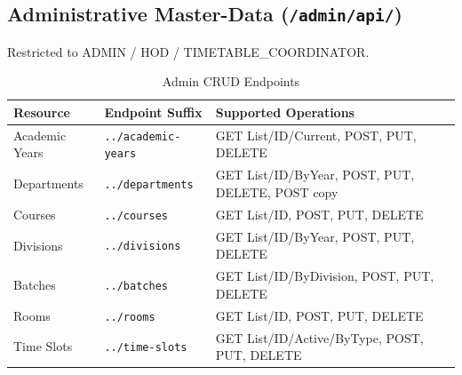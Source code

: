 \subsection{Administrative Master-Data (\texttt{/admin/api/})}
Restricted to ADMIN / HOD / TIMETABLE\_COORDINATOR.
\begin{table}[H]
    \centering
    \renewcommand{\arraystretch}{1.4}
    \begin{tabular}{|p{3.2cm}|p{4.5cm}|p{6.5cm}|}
        \hline
        \textbf{Resource} & \textbf{Endpoint Suffix} & \textbf{Supported Operations} \\
        \hline
        Academic Years & \texttt{../academic-years} & GET List/ID/Current, POST, PUT, DELETE \\
        \hline
        Departments & \texttt{../departments} & GET List/ID/ByYear, POST, PUT, DELETE, POST copy \\
        \hline
        Courses & \texttt{../courses} & GET List/ID, POST, PUT, DELETE \\
        \hline
        Divisions & \texttt{../divisions} & GET List/ID/ByYear, POST, PUT, DELETE \\
        \hline
        Batches & \texttt{../batches} & GET List/ID/ByDivision, POST, PUT, DELETE \\
        \hline
        Rooms & \texttt{../rooms} & GET List/ID, POST, PUT, DELETE \\
        \hline
        Time Slots & \texttt{../time-slots} & GET List/ID/Active/ByType, POST, PUT, DELETE \\
        \hline
    \end{tabular}
    \caption{Admin CRUD Endpoints}
    \label{tab:api_admin_crud}
\end{table}


